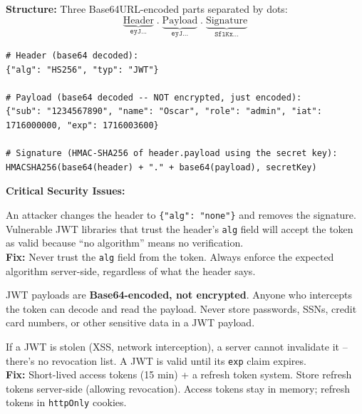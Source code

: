 \documentclass[11pt, letterpaper]{article}
\begin{document}
\textbf{Structure:} Three Base64URL-encoded parts separated by dots:
\[
  \underbrace{\text{Header}}_{\texttt{eyJ...}} \; . \;
  \underbrace{\text{Payload}}_{\texttt{eyJ...}} \; . \;
  \underbrace{\text{Signature}}_{\texttt{SflKx...}}
\]

\begin{lstlisting}[style=shell, caption={Decoded JWT structure (use jwt.io to inspect)}]
# Header (base64 decoded):
{"alg": "HS256", "typ": "JWT"}

# Payload (base64 decoded -- NOT encrypted, just encoded):
{"sub": "1234567890", "name": "Oscar", "role": "admin", "iat": 1716000000, "exp": 1716003600}

# Signature (HMAC-SHA256 of header.payload using the secret key):
HMACSHA256(base64(header) + "." + base64(payload), secretKey)
\end{lstlisting}

\textbf{Critical Security Issues:}

\begin{tcolorbox}[colback=part6bg, colframe=sectionred,
  title={\bfseries Attack 1: The \texttt{alg: none} Attack}, arc=3pt, boxrule=1pt]
An attacker changes the header to \texttt{\{"alg": "none"\}} and removes the signature. Vulnerable JWT libraries that trust the header's \texttt{alg} field will accept the token as valid because ``no algorithm'' means no verification.\\[4pt]
\textbf{Fix:} Never trust the \texttt{alg} field from the token. Always enforce the expected algorithm server-side, regardless of what the header says.
\end{tcolorbox}

\begin{tcolorbox}[colback=part6bg, colframe=sectionred,
  title={\bfseries Attack 2: Sensitive Data in Payload}, arc=3pt, boxrule=1pt]
JWT payloads are \textbf{Base64-encoded, not encrypted}. Anyone who intercepts the token can decode and read the payload. Never store passwords, SSNs, credit card numbers, or other sensitive data in a JWT payload.
\end{tcolorbox}

\begin{tcolorbox}[colback=part6bg, colframe=sectionred,
  title={\bfseries Attack 3: Long-Lived Tokens Without Refresh}, arc=3pt, boxrule=1pt]
If a JWT is stolen (XSS, network interception), a server cannot invalidate it -- there's no revocation list. A JWT is valid until its \texttt{exp} claim expires.\\[4pt]
\textbf{Fix:} Short-lived access tokens (15 min) + a refresh token system. Store refresh tokens server-side (allowing revocation). Access tokens stay in memory; refresh tokens in \texttt{httpOnly} cookies.
\end{tcolorbox}
\end{document}
